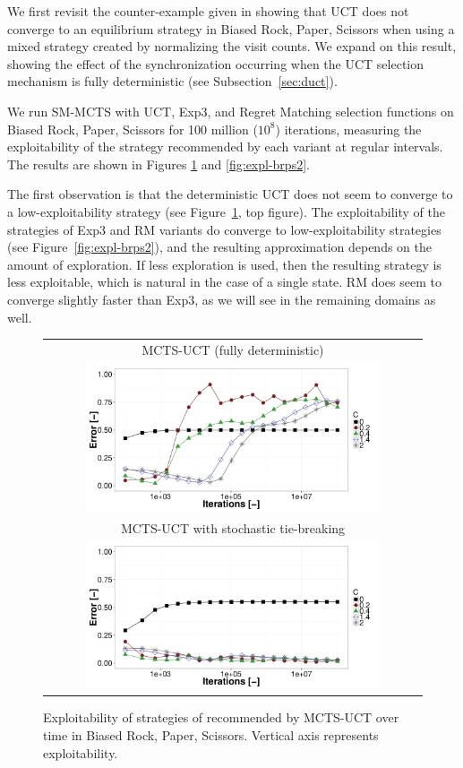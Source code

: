 We first revisit the counter-example given in \cite{Shafiei09} showing that
UCT does not converge to an equilibrium strategy in Biased Rock, Paper, Scissors
when using a mixed strategy created by normalizing the visit counts.
We expand on this result, showing the effect of the synchronization occurring when the UCT selection mechanism is fully deterministic (see Subsection~\ref{sec:duct}).

We run SM-MCTS with UCT, Exp3, and Regret Matching selection functions on Biased Rock, Paper, Scissors
for 100 million ($10^8$) iterations, measuring the exploitability of the strategy recommended by
each variant at regular intervals. The results are shown in Figures \ref{fig:expl-brps1} and \ref{fig:expl-brps2}.

The first observation is that the deterministic UCT does not seem to converge to a low-exploitability strategy (see Figure~\ref{fig:expl-brps1}, top figure). The exploitability of the strategies of
Exp3 and RM variants do converge to low-exploitability strategies (see Figure~\ref{fig:expl-brps2}), and the resulting approximation depends on the amount of exploration.
If less exploration is used, then the resulting strategy is less exploitable, which is natural in the case of a single state. RM does seem to
converge slightly faster than Exp3, as we will see in the remaining domains as well.

\begin{figure}[t!]
\centering
\begin{tabular}{c}
{\small MCTS-UCT (fully deterministic)} \\
\includegraphics[width=0.8\textwidth]{figures/brps-MCTS-UCT.pdf} \\
{\small MCTS-UCT with stochastic tie-breaking} \\
\includegraphics[width=0.8\textwidth]{figures/brps-MCTS-UCT-NONDET.pdf} \\
\end{tabular}
\caption{Exploitability of strategies of recommended by MCTS-UCT over time in Biased Rock, Paper, Scissors. Vertical axis represents exploitability. }
\label{fig:expl-brps1}
\end{figure}

